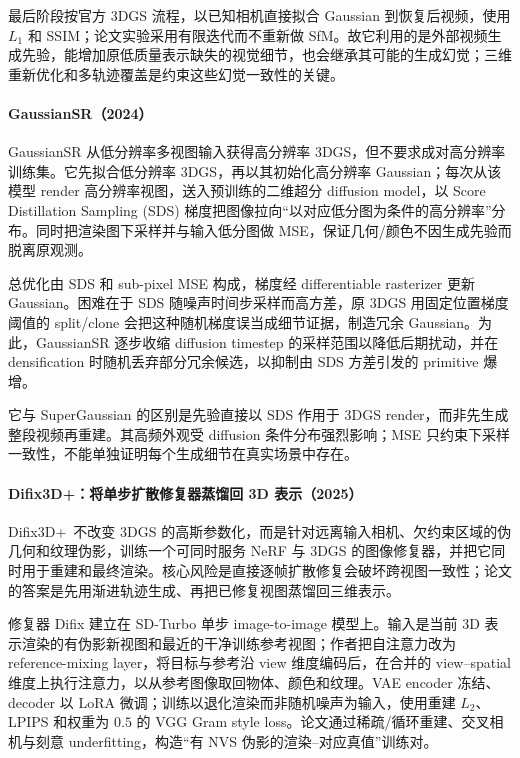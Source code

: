 最后阶段按官方 3DGS 流程，以已知相机直接拟合 Gaussian 到恢复后视频，使用 $L_1$ 和 SSIM；论文实验采用有限迭代而不重新做 SfM。故它利用的是外部视频生成先验，能增加原低质量表示缺失的视觉细节，也会继承其可能的生成幻觉；三维重新优化和多轨迹覆盖是约束这些幻觉一致性的关键。

\paragraph{GaussianSR（2024）\cite{2406_10111}}
GaussianSR 从低分辨率多视图输入获得高分辨率 3DGS，但不要求成对高分辨率训练集。它先拟合低分辨率 3DGS，再以其初始化高分辨率 Gaussian；每次从该模型 render 高分辨率视图，送入预训练的二维超分 diffusion model，以 Score Distillation Sampling (SDS) 梯度把图像拉向“以对应低分图为条件的高分辨率”分布。同时把渲染图下采样并与输入低分图做 MSE，保证几何/颜色不因生成先验而脱离原观测。

总优化由 SDS 和 sub-pixel MSE 构成，梯度经 differentiable rasterizer 更新 Gaussian。困难在于 SDS 随噪声时间步采样而高方差，原 3DGS 用固定位置梯度阈值的 split/clone 会把这种随机梯度误当成细节证据，制造冗余 Gaussian。为此，GaussianSR 逐步收缩 diffusion timestep 的采样范围以降低后期扰动，并在 densification 时随机丢弃部分冗余候选，以抑制由 SDS 方差引发的 primitive 爆增。

它与 SuperGaussian 的区别是先验直接以 SDS 作用于 3DGS render，而非先生成整段视频再重建。其高频外观受 diffusion 条件分布强烈影响；MSE 只约束下采样一致性，不能单独证明每个生成细节在真实场景中存在。

\paragraph{Difix3D+：将单步扩散修复器蒸馏回 3D 表示（2025）\cite{2503_01774}}
Difix3D+~\cite{2503_01774}不改变 3DGS 的高斯参数化，而是针对远离输入相机、欠约束区域的伪几何和纹理伪影，训练一个可同时服务 NeRF 与 3DGS 的图像修复器，并把它同时用于重建和最终渲染。核心风险是直接逐帧扩散修复会破坏跨视图一致性；论文的答案是先用渐进轨迹生成、再把已修复视图蒸馏回三维表示。

修复器 Difix 建立在 SD-Turbo 单步 image-to-image 模型上。输入是当前 3D 表示渲染的有伪影新视图和最近的干净训练参考视图；作者把自注意力改为 reference-mixing layer，将目标与参考沿 view 维度编码后，在合并的 view--spatial 维度上执行注意力，以从参考图像取回物体、颜色和纹理。VAE encoder 冻结、decoder 以 LoRA 微调；训练以退化渲染而非随机噪声为输入，使用重建 $L_2$、LPIPS 和权重为 $0.5$ 的 VGG Gram style loss。论文通过稀疏/循环重建、交叉相机与刻意 underfitting，构造“有 NVS 伪影的渲染--对应真值”训练对。

